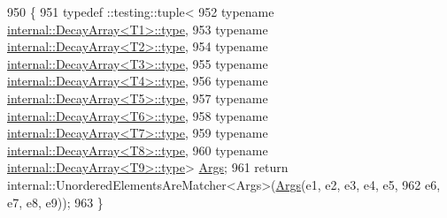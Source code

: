 {\begin{DoxyCode}
950                                                                           \{
951   typedef ::testing::tuple<
952       \textcolor{keyword}{typename} \hyperlink{namespaceupload_a4fc56f0dd6613be15c3c4dc3af3619ce}{internal::DecayArray<T1>::type},
953       \textcolor{keyword}{typename} \hyperlink{namespaceupload_a4fc56f0dd6613be15c3c4dc3af3619ce}{internal::DecayArray<T2>::type},
954       \textcolor{keyword}{typename} \hyperlink{namespaceupload_a4fc56f0dd6613be15c3c4dc3af3619ce}{internal::DecayArray<T3>::type},
955       \textcolor{keyword}{typename} \hyperlink{namespaceupload_a4fc56f0dd6613be15c3c4dc3af3619ce}{internal::DecayArray<T4>::type},
956       \textcolor{keyword}{typename} \hyperlink{namespaceupload_a4fc56f0dd6613be15c3c4dc3af3619ce}{internal::DecayArray<T5>::type},
957       \textcolor{keyword}{typename} \hyperlink{namespaceupload_a4fc56f0dd6613be15c3c4dc3af3619ce}{internal::DecayArray<T6>::type},
958       \textcolor{keyword}{typename} \hyperlink{namespaceupload_a4fc56f0dd6613be15c3c4dc3af3619ce}{internal::DecayArray<T7>::type},
959       \textcolor{keyword}{typename} \hyperlink{namespaceupload_a4fc56f0dd6613be15c3c4dc3af3619ce}{internal::DecayArray<T8>::type},
960       \textcolor{keyword}{typename} \hyperlink{namespaceupload_a4fc56f0dd6613be15c3c4dc3af3619ce}{internal::DecayArray<T9>::type}> 
      \hyperlink{namespacetesting_a09ac462e8d6ed468cbfaa9c767aee0aa}{Args};
961   \textcolor{keywordflow}{return} internal::UnorderedElementsAreMatcher<Args>(\hyperlink{namespacetesting_a09ac462e8d6ed468cbfaa9c767aee0aa}{Args}(e1, e2, e3, e4, e5,
962       e6, e7, e8, e9));
963 \}
\end{DoxyCode}
}
